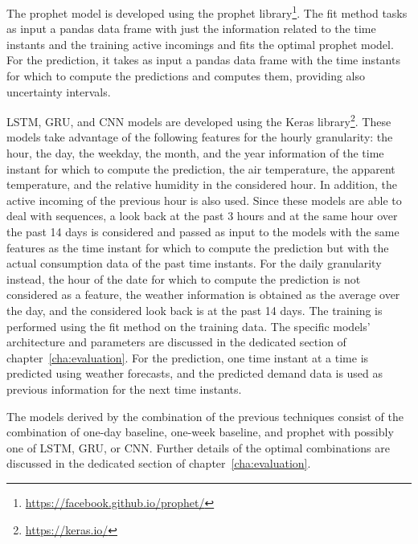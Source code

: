 The prophet model is developed using the prophet library\footnote{ \url{https://facebook.github.io/prophet/} }.
The fit method tasks as input a pandas data frame with just the information related to the time instants and the training active incomings and fits the optimal prophet model.
For the prediction, it takes as input a pandas data frame with the time instants for which to compute the predictions and computes them, providing also uncertainty intervals.

LSTM, GRU, and CNN models are developed using the Keras library\footnote{ \url{https://keras.io/} }.
These models take advantage of the following features for the hourly granularity: the hour, the day, the weekday, the month, and the year information of the time instant for which to compute the prediction, the air temperature, the apparent temperature, and the relative humidity in the considered hour.
In addition, the active incoming of the previous hour is also used.
Since these models are able to deal with sequences, a look back at the past 3 hours and at the same hour over the past 14 days is considered and passed as input to the models with the same features as the time instant for which to compute the prediction but with the actual consumption data of the past time instants.
For the daily granularity instead, the hour of the date for which to compute the prediction is not considered as a feature, the weather information is obtained as the average over the day, and the considered look back is at the past 14 days.
The training is performed using the fit method on the training data.
The specific models’ architecture and parameters are discussed in the dedicated section of chapter~\ref{cha:evaluation}.
For the prediction, one time instant at a time is predicted using weather forecasts, and the predicted demand data is used as previous information for the next time instants.

The models derived by the combination of the previous techniques consist of the combination of one-day baseline, one-week baseline, and prophet with possibly one of LSTM, GRU, or CNN.
Further details of the optimal combinations are discussed in the dedicated section of chapter~\ref{cha:evaluation}.

